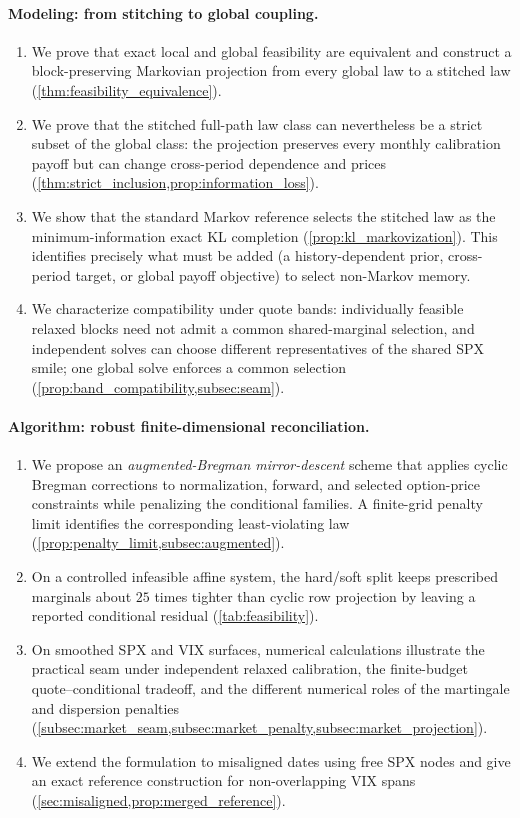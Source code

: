 \documentclass{article}
\begin{document}
\paragraph{Modeling: from stitching to global coupling.}
\begin{enumerate}[label=(\roman*)]
    \item We prove that exact local and global feasibility are equivalent and construct a block-preserving Markovian projection from every global law to a stitched law (\cref{thm:feasibility_equivalence}).
    \item We prove that the stitched full-path law class can nevertheless be a strict subset of the global class: the projection preserves every monthly calibration payoff but can change cross-period dependence and prices (\cref{thm:strict_inclusion,prop:information_loss}).
    \item We show that the standard Markov reference selects the stitched law as the minimum-information exact KL completion (\cref{prop:kl_markovization}). This identifies precisely what must be added (a history-dependent prior, cross-period target, or global payoff objective) to select non-Markov memory.
    \item We characterize compatibility under quote bands: individually feasible relaxed blocks need not admit a common shared-marginal selection, and independent solves can choose different representatives of the shared SPX smile; one global solve enforces a common selection (\cref{prop:band_compatibility,subsec:seam}).
\end{enumerate}

\paragraph{Algorithm: robust finite-dimensional reconciliation.}
\begin{enumerate}[label=(\roman*),resume]
    \item We propose an \emph{augmented-Bregman mirror-descent} scheme that applies cyclic Bregman corrections to normalization, forward, and selected option-price constraints while penalizing the conditional families.
    A finite-grid penalty limit identifies the corresponding least-violating law (\cref{prop:penalty_limit,subsec:augmented}).
    \item On a controlled infeasible affine system, the hard/soft split keeps prescribed marginals about $25$ times tighter than cyclic row projection by leaving a reported conditional residual (\cref{tab:feasibility}).
    \item On smoothed SPX and VIX surfaces, numerical calculations illustrate the practical seam under independent relaxed calibration, the finite-budget quote--conditional tradeoff, and the different numerical roles of the martingale and dispersion penalties (\cref{subsec:market_seam,subsec:market_penalty,subsec:market_projection}).
    \item We extend the formulation to misaligned dates using free SPX nodes and give an exact reference construction for non-overlapping VIX spans (\cref{sec:misaligned,prop:merged_reference}).
\end{enumerate}
\end{document}
